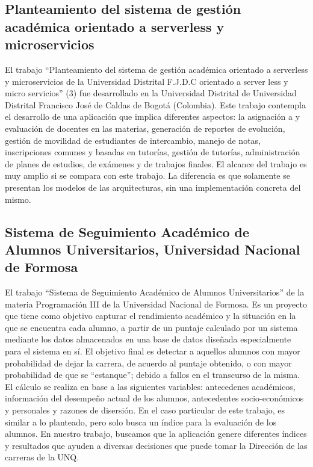 \subsection[Planteamiento del sistema de gestión académica orientado a serverless y microservicios]{Planteamiento del sistema de gestión académica orientado a serverless y microservicios}

El trabajo “Planteamiento del sistema de gestión académica orientado a serverless y microservicios de la Universidad Distrital F.J.D.C
orientado a server less y micro servicios” (3) fue desarrollado en la Universidad Distrital de Universidad Distrital Francisco José de Caldas de Bogotá (Colombia). Este trabajo contempla el desarrollo de una aplicación que implica diferentes aspectos: la asignación a y evaluación de docentes en las materias, generación de reportes de evolución, gestión de movilidad de estudiantes de intercambio, manejo de notas, inscripciones comunes y basadas en tutorías, gestión de tutorías, administración de planes de estudios, de exámenes y de trabajos finales. El alcance del trabajo es muy amplio si se compara con este trabajo. La diferencia es que solamente se presentan los modelos de las arquitecturas, sin una implementación concreta del mismo.


\subsection[Sistema de Seguimiento Académico de Alumnos Universitarios, Universidad Nacional de Formosa]{Sistema de Seguimiento Académico de Alumnos Universitarios, Universidad Nacional de Formosa}
El trabajo “Sistema de Seguimiento Académico de Alumnos Universitarios”  de la materia Programación III de la Universidad Nacional de Formosa. Es un proyecto que tiene como objetivo capturar el rendimiento académico y la situación en la que se encuentra cada alumno, a partir de un puntaje calculado por un sistema mediante los datos almacenados en una base
de datos diseñada especialmente para el sistema en sí. El objetivo final es detectar a aquellos alumnos con mayor probabilidad de dejar la carrera, de acuerdo al puntaje obtenido, o con mayor probabilidad de que se “estanque”; debido a fallos en el transcurso de la misma. El cálculo se realiza en base a las siguientes variables: antecedenes académicos, información del desempeño actual de los alumnos, antecedentes socio-económicos y personales y razones de disersión. En el caso particular de este trabajo, es similar a lo planteado, pero solo busca un índice para la evaluación de los alumnos. En nuestro trabajo, buscamos que la aplicación genere diferentes índices y resultados que ayuden a diversas decisiones que puede tomar la
Dirección de las carreras de la UNQ.

